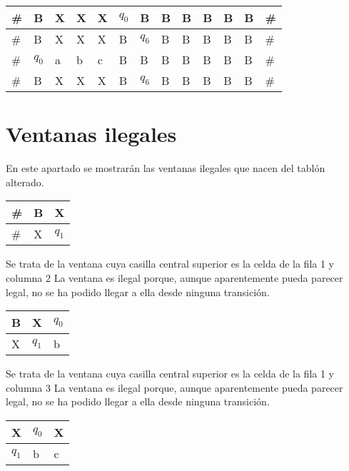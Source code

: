 ﻿\documentclass[a4paper,10pt]{article}
\begin{document}
\begin{table}[h]
\begin{tabular}{|l|l|l|l|l|l|l|l|l|l|l|l|l|}
	\#  &   B   &   X   &   X   &   X   &   $q_0$  &   B   &   B   &   B   &   B   &   B   &   B   &   \#	\\ \hline
	\#  &   B   &   X   &   X   &   X   &   B   &   $q_6$  &   B   &   B   &   B   &   B   &   B   &   \#	\\ \hline
	\#  &   $q_0$  &   a   &   b   &   c   &   B   &   B   &   B   &   B   &   B   &   B   &   B   &   \#	\\ \hline
	\#  &   B   &   X   &   X   &   X   &   B   &   $q_6$  &   B   &   B   &   B   &   B   &   B   &   \#	\\ \hline
\end{tabular}
\end{table}
\section{Ventanas ilegales}
En este apartado se mostrarán las ventanas ilegales que nacen del tablón alterado.\newline\begin{table}[h!]
\centering
\begin{tabular}{|l|l|l|}
\hline
	\#  &   B   &   X	\\ \hline
	\#  &   X   &   $q_1$	\\ \hline
\end{tabular}
\end{table}

Se trata de la ventana cuya casilla central superior es la celda de la fila 1 y columna 2\newline
La ventana es ilegal porque, aunque aparentemente pueda parecer legal, no se ha podido llegar a ella desde ninguna transición.\newline
\begin{table}[h!]
\centering
\begin{tabular}{|l|l|l|}
\hline
	B   &   X   &   $q_0$	\\ \hline
	X   &   $q_1$  &   b	\\ \hline
\end{tabular}
\end{table}

Se trata de la ventana cuya casilla central superior es la celda de la fila 1 y columna 3\newline
La ventana es ilegal porque, aunque aparentemente pueda parecer legal, no se ha podido llegar a ella desde ninguna transición.\newline
\begin{table}[h!]
\centering
\begin{tabular}{|l|l|l|}
\hline
	X   &   $q_0$  &   X	\\ \hline
	$q_1$  &   b   &   c	\\ \hline
\end{tabular}
\end{table}
\end{document}
